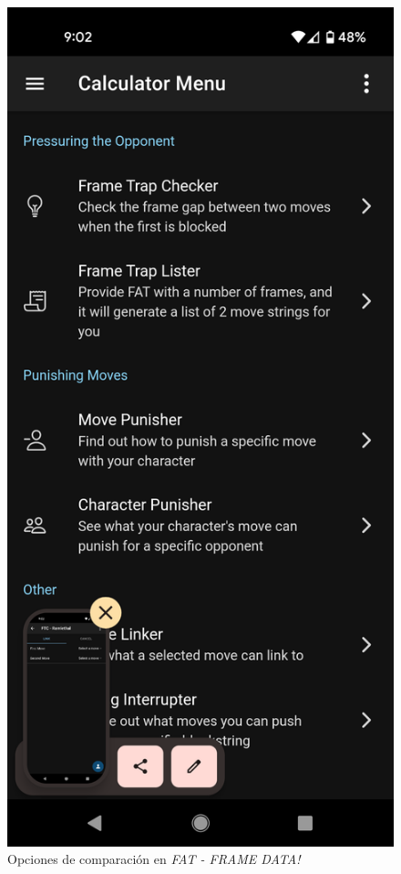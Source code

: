 \begin{figure}
    \centering
    \includegraphics[height=0.4\textheight]{figures/compare_options.png}
    \caption{Opciones de comparación en \textit{FAT - FRAME DATA!}}
    \label{fig: compare options}
\end{figure}

